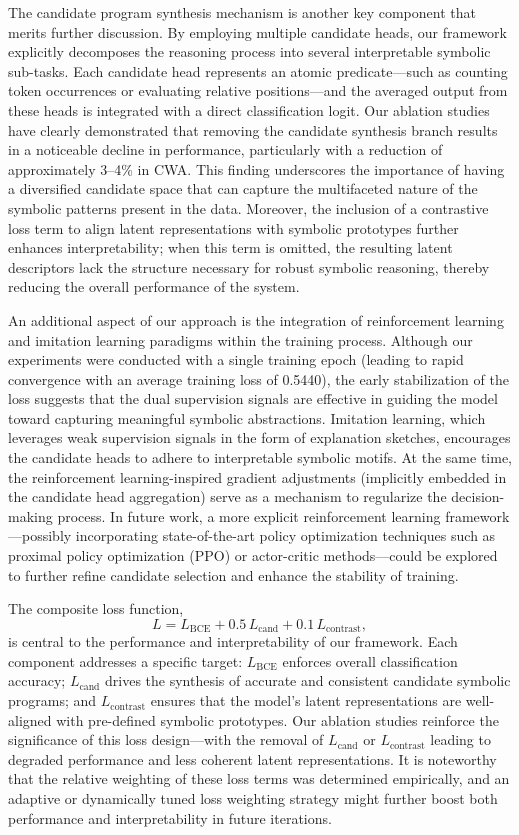 \documentclass[11pt]{article}
\begin{document}
The candidate program synthesis mechanism is another key component that merits further discussion. By employing multiple candidate heads, our framework explicitly decomposes the reasoning process into several interpretable symbolic sub-tasks. Each candidate head represents an atomic predicate—such as counting token occurrences or evaluating relative positions—and the averaged output from these heads is integrated with a direct classification logit. Our ablation studies have clearly demonstrated that removing the candidate synthesis branch results in a noticeable decline in performance, particularly with a reduction of approximately 3–4\% in CWA. This finding underscores the importance of having a diversified candidate space that can capture the multifaceted nature of the symbolic patterns present in the data. Moreover, the inclusion of a contrastive loss term to align latent representations with symbolic prototypes further enhances interpretability; when this term is omitted, the resulting latent descriptors lack the structure necessary for robust symbolic reasoning, thereby reducing the overall performance of the system.

An additional aspect of our approach is the integration of reinforcement learning and imitation learning paradigms within the training process. Although our experiments were conducted with a single training epoch (leading to rapid convergence with an average training loss of 0.5440), the early stabilization of the loss suggests that the dual supervision signals are effective in guiding the model toward capturing meaningful symbolic abstractions. Imitation learning, which leverages weak supervision signals in the form of explanation sketches, encourages the candidate heads to adhere to interpretable symbolic motifs. At the same time, the reinforcement learning-inspired gradient adjustments (implicitly embedded in the candidate head aggregation) serve as a mechanism to regularize the decision-making process. In future work, a more explicit reinforcement learning framework—possibly incorporating state-of-the-art policy optimization techniques such as proximal policy optimization (PPO) or actor-critic methods—could be explored to further refine candidate selection and enhance the stability of training.

The composite loss function,
\[
L = L_{\text{BCE}} + 0.5\,L_{\text{cand}} + 0.1\,L_{\text{contrast}},
\]
is central to the performance and interpretability of our framework. Each component addresses a specific target: \(L_{\text{BCE}}\) enforces overall classification accuracy; \(L_{\text{cand}}\) drives the synthesis of accurate and consistent candidate symbolic programs; and \(L_{\text{contrast}}\) ensures that the model’s latent representations are well-aligned with pre-defined symbolic prototypes. Our ablation studies reinforce the significance of this loss design—with the removal of \(L_{\text{cand}}\) or \(L_{\text{contrast}}\) leading to degraded performance and less coherent latent representations. It is noteworthy that the relative weighting of these loss terms was determined empirically, and an adaptive or dynamically tuned loss weighting strategy might further boost both performance and interpretability in future iterations.
\end{document}
